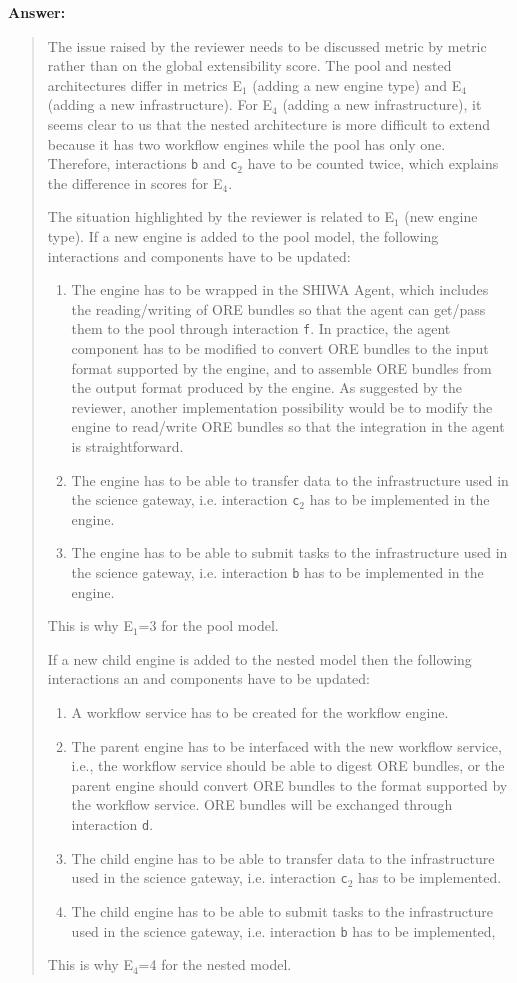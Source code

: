 \documentclass[a4]{article}
\newenvironment{answer}%
{\textbf{Answer:}\begin{small}\begin{quote}}%
{\end{quote}\end{small}}%
\begin{document}
\begin{answer}
  The issue raised by the reviewer needs to be discussed metric by
  metric rather than on the global extensibility score. The pool and
  nested architectures differ in metrics E$_1$ (adding a new engine
  type) and E$_4$ (adding a new infrastructure). For E$_4$ (adding a
  new infrastructure), it seems clear to us that the nested
  architecture is more difficult to extend because it has two workflow
  engines while the pool has only one. Therefore, interactions
  \texttt{b} and \texttt{c$_2$} have to be counted twice, which
  explains the difference in scores for E$_4$. 

  The situation highlighted by the reviewer is related to E$_1$ (new
  engine type). If a new engine is added to the pool model, the
  following interactions and components have to be updated:
 \begin{enumerate}
 \item The engine has to be wrapped in the SHIWA Agent, which includes
   the reading/writing of ORE bundles so that the agent can get/pass
   them to the pool through interaction \texttt{f}. In practice, the
   agent component has to be modified to convert ORE bundles to the
   input format supported by the engine, and to assemble ORE bundles
   from the output format produced by the engine. As suggested by the
   reviewer, another implementation possibility would be to modify the
   engine to read/write ORE bundles so that the integration in the
   agent is straightforward.
 \item The engine has to be able to transfer data to the
   infrastructure used in the science gateway, i.e. interaction
   \texttt{c$_2$} has to be implemented in the engine.
 \item The engine has to be able to submit tasks to the infrastructure
   used in the science gateway, i.e. interaction \texttt{b} has to be
   implemented in the engine.
 \end{enumerate}
This is why E$_1$=3 for the pool model.

If a new child engine is added to the nested model then the following interactions an and components have to be updated:
\begin{enumerate}
\item A workflow service has to be created for the workflow engine.
\item The parent engine has to be interfaced with the new workflow
  service, i.e., the workflow service should be able to digest ORE
  bundles, or the parent engine should convert ORE bundles to the
  format supported by the workflow service. ORE bundles will be
  exchanged through interaction \texttt{d}.
 \item The child engine has to be able to transfer data to the
   infrastructure used in the science gateway, i.e. interaction
   \texttt{c$_2$} has to be implemented.
 \item The child engine has to be able to submit tasks to the infrastructure
   used in the science gateway, i.e. interaction \texttt{b} has to be
   implemented,
\end{enumerate}
This is why E$_4$=4 for the nested model.


\end{answer}
\end{document}
